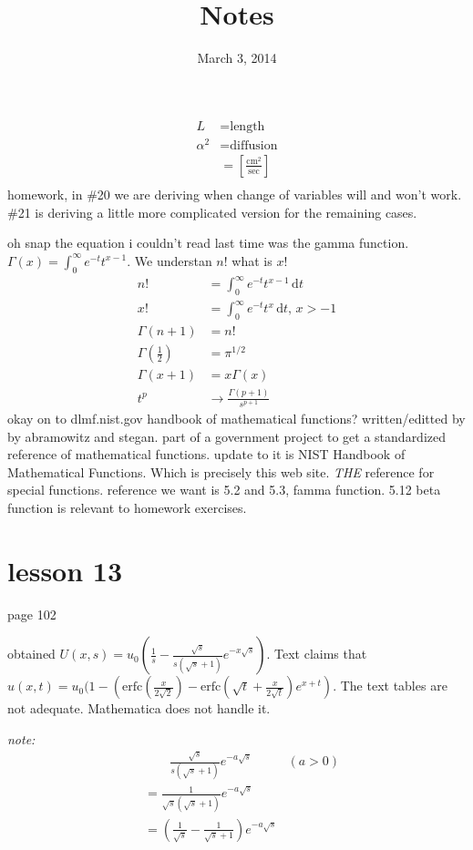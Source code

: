\documentclass{article}
\begin{document}
\title{Notes}
\date{March 3, 2014}
\maketitle
\begin{align*}
  L&=\text{length}\\
  \alpha ^2&=\text{diffusion}\\
  &=\left[\frac{\text{cm}^2}{\text{sec}}\right]\\
\end{align*}
homework, in \#20 we are deriving when change of variables will and won't work. \#21 is deriving a little more complicated version for the remaining cases.

oh snap the equation i couldn't read last time was the gamma function. $\Gamma(x)=\int_0^\infty{e^{-t}t^{x-1}}$. We understan $n!$ what is $x!$
\begin{align*}
  n!&=\int_0^\infty{e^{-t}t^{x-1}\,\mathrm{d}t}\\
  x!&=\int_0^\infty{e^{-t}t^{x}\,\mathrm{d}t},\,x>-1\\
  \Gamma(n+1)&=n!\\
  \Gamma\left(\frac{1}{2}\right)&=\pi^{1/2}\\
  \Gamma(x+1)&=x\Gamma(x)\\
  t^p&\to\frac{\Gamma(p+1)}{s^{p+1}}
\end{align*}
okay on to dlmf.nist.gov  
handbook of mathematical functions? written/editted by by abramowitz and stegan. part of a government project to get a standardized reference of mathematical functions. update to it is NIST Handbook of Mathematical Functions. Which is precisely this web site. \emph{THE} reference for special functions.
reference we want is 5.2 and 5.3, famma function. 5.12 beta function is relevant to homework exercises.

\section*{lesson 13}
page 102

obtained $U(x,s)=u_0\left(\frac{1}{s}-\frac{\sqrt{s}}{s(\sqrt{s}+1)}e^{-x\sqrt{s}}\right)$. Text claims that $u(x,t)=u_0(1-(\text{erfc}(\frac{x}{2\sqrt{2}})-\text{erfc}(\sqrt{t}+\frac{x}{2\sqrt{t}})e^{x+t})$. The text tables are not adequate. Mathematica does not handle it.

\emph{note:}
\begin{align*}
  &\qquad\frac{\sqrt{s}}{s(\sqrt{s}+1)}e^{-a\sqrt{s}}&(a>0)\\
  &=\frac{1}{\sqrt{s}(\sqrt{s}+1)}e^{-a\sqrt{s}}\\
  &=(\frac{1}{\sqrt{s}}-\frac{1}{\sqrt{s}+1})e^{-a\sqrt{s}}
\end{align*}
\end{document}
